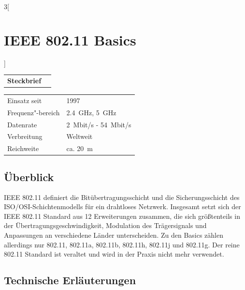 \begin{multicols}{3}[\section{IEEE 802.11 Basics}]


\newrefsegment

\begin{boxedminipage}{\linewidth}
\begin{tabular}{p{}p{2.7 cm}}
\textbf{Steckbrief}& \\
\end{tabular}
\begin{tabular}{p{}p{2.7 cm}}
      Einsatz seit & 1997\\
      Frequenz"-bereich  & \SI{2.4}{\giga\hertz}, \SI{5}{\giga\hertz} \\
      Datenrate & \SI{2}{Mbit/s} - \SI{54}{Mbit/s}\\
      Verbreitung & Weltweit\\
      Reichweite & ca. \SI{20}{\metre}\\
\end{tabular}
\end{boxedminipage}
\par
\subsection*{Überblick}

IEEE 802.11 definiert die Bitübertragungsschicht und die Sicherungsschicht des ISO/OSI-Schichtenmodells für ein drahtloses Netzwerk.
Insgesamt setzt sich der IEEE 802.11 Standard aus 12 Erweiterungen zusammen, die sich größtenteils in der  Übertragungsgeschwindigkeit,  Modulation des Trägersignals und Anpassungen an verschiedene Länder unterscheiden. Zu den Basics zählen allerdings nur 802.11, 802.11a, 802.11b, 802.11h, 802.11j und 802.11g. 
Der reine 802.11 Standard ist veraltet und wird in der Praxis nicht mehr verwendet.


\subsection*{Technische Erläuterungen}

\end{multicols}
